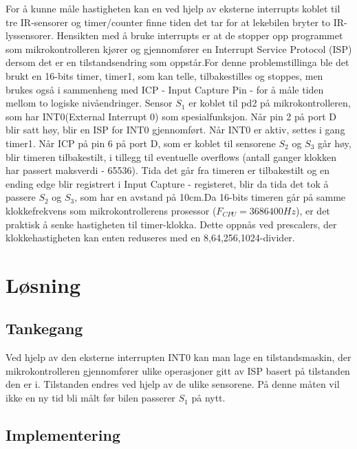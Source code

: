 \documentclass[11pt, a4paper]{article}
\begin{document}
For å kunne måle hastigheten kan en ved hjelp av eksterne interrupts koblet til tre IR-sensorer og timer/counter finne tiden det tar for at lekebilen bryter to IR-lyssensorer.
Hensikten med å bruke interrupts er at de stopper opp programmet som mikrokontrolleren kjører og gjennomfører en Interrupt Service Protocol (ISP) dersom det er en tilstandsendring som oppstår.\newline For denne problemstillinga ble det brukt en 16-bits timer, timer1, som kan telle, tilbakestilles og stoppes, men brukes også i sammenheng med ICP - Input Capture Pin - for å måle tiden mellom to logiske nivåendringer. 
Sensor $S_{1}$ er koblet til pd2 på mikrokontrolleren, som har INT0(External Interrupt 0) som spesialfunksjon. Når pin 2 på port D blir satt høy, blir en ISP for INT0 gjennomført. Når INT0 er aktiv, settes i gang timer1. Når ICP på pin 6 på port D, som er koblet til sensorene $S_{2}$ og $S_{3}$ går høy, blir timeren tilbakestilt, i tillegg til eventuelle overflows (antall ganger klokken har passert maksverdi - 65536). Tida det går fra timeren er tilbakestilt og en ending edge blir registrert i Input Capture - registeret, blir da tida det tok å passere $S_{2}$ og $S_{3}$, som har en avstand på 10cm.\newline Da 16-bits timeren går på samme klokkefrekvens som mikrokontrollerens prosessor ($F_{CPU} = 3686400 Hz$), er det praktisk å senke hastigheten til timer-klokka. Dette oppnås ved prescalers, der klokkehastigheten kan enten reduseres med en 8,64,256,1024-divider. 


\section{Løsning}
\subsection{Tankegang}
Ved hjelp av den eksterne interrupten INT0 kan man lage en tilstandsmaskin, der mikrokontrolleren gjennomfører ulike operasjoner gitt av ISP basert på tilstanden den er i. Tilstanden endres ved hjelp av de ulike sensorene. På denne måten vil ikke en ny tid bli målt før bilen passerer $S_{1}$ på nytt. 


\subsection{Implementering}
\end{document}
